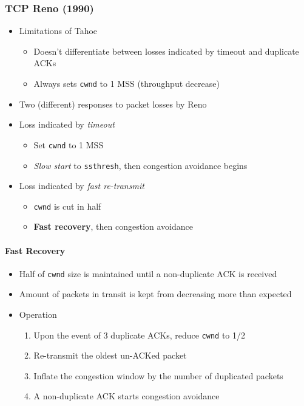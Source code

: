 \subsubsection{TCP Reno (1990)}
\begin{itemize}
	\item Limitations of Tahoe
	\begin{itemize}
		\item Doesn't differentiate between losses indicated by timeout and duplicate ACKs
		\item Always sets \texttt{cwnd} to 1 MSS (throughput decrease)
	\end{itemize}
	\item Two (different) responses to packet losses by Reno
	\item Loss indicated by \textit{timeout}
	\begin{itemize}
		\item Set \texttt{cwnd} to 1 MSS
		\item \textit{Slow start} to \texttt{ssthresh}, then congestion avoidance begins
	\end{itemize}
	\item Loss indicated by \textit{fast re-transmit}
	\begin{itemize}
		\item \texttt{cwnd} is cut in half
		\item \textbf{Fast recovery}, then congestion avoidance
	\end{itemize}
\end{itemize}

\paragraph{Fast Recovery}
\begin{itemize}
	\item Half of \texttt{cwnd} size is maintained until a non-duplicate ACK is received
	\item Amount of packets in transit is kept from decreasing more than expected
	\item Operation
	\begin{enumerate}
		\item Upon the event of 3 duplicate ACKs, reduce \texttt{cwnd} to 1/2
		\item Re-transmit the oldest un-ACKed packet
		\item Inflate the congestion window by the number of duplicated packets
		\item A non-duplicate ACK starts congestion avoidance
	\end{enumerate}
\end{itemize}

